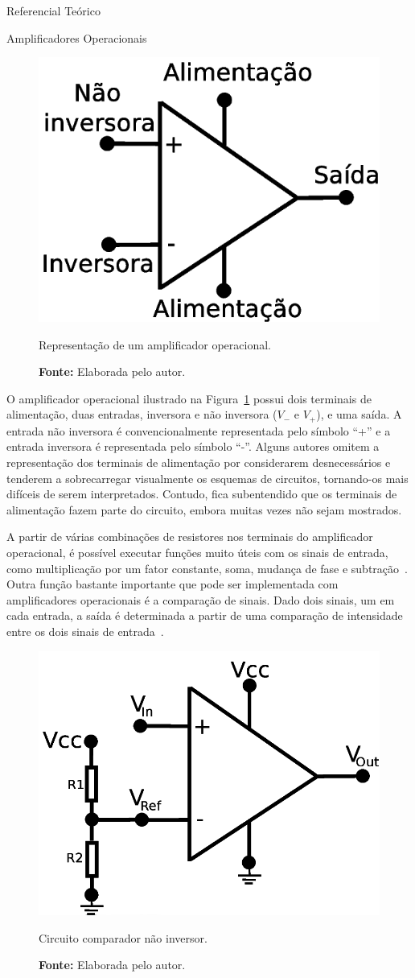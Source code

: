 \begin{chapter}{Referencial Teórico}
\begin{section}{Amplificadores Operacionais}
\begin{figure}[!h]
	\centering
	\begin{minipage}[c]{\textwidth}
	\centering
	\includegraphics[width=0.4\linewidth]{fig/opamp}
	\caption{Representação de um amplificador operacional.}
	\vspace{-1cm}
	\caption*{\textbf{Fonte: }Elaborada pelo autor.}
	\label{fig:opamp}
	\end{minipage}
\end{figure}

O amplificador operacional ilustrado na Figura~\ref{fig:opamp} possui dois
terminais de alimentação, duas entradas, inversora e não inversora ($V_{-}$ e
$V_{+}$), e uma saída. A entrada não inversora é convencionalmente representada
pelo símbolo ``+'' e a entrada inversora é representada pelo símbolo ``-''.
Alguns autores omitem a representação dos terminais de alimentação por
considerarem desnecessários e tenderem a sobrecarregar visualmente os esquemas
de circuitos, tornando-os mais difíceis de serem interpretados. Contudo, fica
subentendido que os terminais de alimentação fazem parte do circuito, embora
muitas vezes não sejam mostrados.

A partir de várias combinações de resistores nos terminais do amplificador
operacional, é possível executar funções muito úteis com os sinais de entrada, 
como multiplicação por um fator constante, soma, mudança de fase e
subtração~\cite{Nilson09}. Outra função bastante importante que pode ser
implementada com amplificadores operacionais é a comparação de sinais. Dado dois
sinais, um em cada entrada, a saída é determinada a partir de uma comparação de
intensidade entre os dois sinais de entrada~\cite{Terrell96}.  
 

\begin{figure}[!h]
	\centering
	\begin{minipage}[c]{\textwidth}
	\centering
	\includegraphics[width=0.45\linewidth]{fig/nao_inversor}
	\caption{Circuito comparador não inversor.}
	\vspace{-1cm}
	\caption*{\textbf{Fonte: }Elaborada pelo autor.}
	\label{fig:comparador1}
	\end{minipage}
\end{figure}


\end{section}
\end{chapter}
